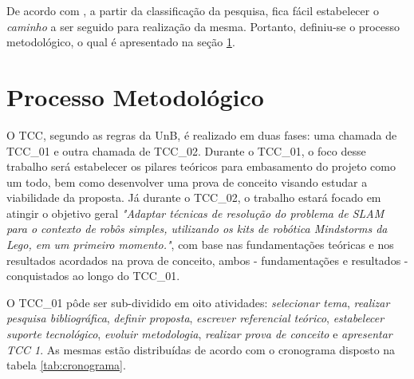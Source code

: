 	De acordo com \cite{fundamentosMetodologia}, a partir da classificação da pesquisa, fica fácil estabelecer o \textit{caminho} a ser seguido para realização da mesma. Portanto, definiu-se o processo metodológico, o qual é apresentado na seção \ref{sec:processo_metodológico}.


\section{Processo Metodológico} %
\label{sec:processo_metodológico}


O TCC, segundo as regras da UnB, é realizado em duas fases: uma chamada de TCC\_01 e outra chamada de TCC\_02. Durante o TCC\_01, o foco desse trabalho será estabelecer os pilares teóricos para embasamento do projeto como um todo, bem como desenvolver uma prova de conceito visando estudar a viabilidade da proposta. Já durante o TCC\_02, o trabalho estará focado em atingir o objetivo geral \textit{"Adaptar técnicas de resolução do problema de SLAM para o contexto de robôs simples, utilizando os kits de robótica Mindstorms da Lego, em um primeiro momento."}, com base nas fundamentações teóricas e nos resultados acordados na prova de conceito, ambos - fundamentações e resultados - conquistados ao longo do TCC\_01.

O TCC\_01 pôde ser sub-dividido em oito atividades: \textit{selecionar tema}, \textit{realizar pesquisa bibliográfica}, \textit{definir proposta}, \textit{escrever referencial teórico}, \textit{estabelecer suporte tecnológico}, \textit{evoluir metodologia}, \textit{realizar prova de conceito} e \textit{apresentar TCC 1}. As mesmas estão distribuídas de acordo com o cronograma disposto na tabela \ref{tab:cronograma}.

